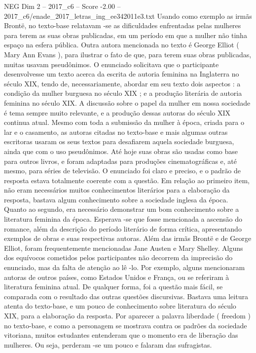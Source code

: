 \begin{textsample}{NEG Dim 2 – 2017\_c6 – Score -2.00 – 2017\_c6/enade\_2017\_letras\_ing\_ee342011e3.txt}
Usando como exemplo as irmãs Brontë, no texto-base relatavam -se as dificuldades enfrentadas pelas mulheres para terem as suas obras publicadas, em um período em que a mulher não tinha espaço na esfera pública.
Outra autora mencionada no texto é George Elliot ( Mary Ann Evans ), para ilustrar o fato de que, para terem suas obras publicadas, muitas usavam pseudônimos.
O enunciado solicitava que o participante desenvolvesse um texto acerca da escrita de autoria feminina na Inglaterra no século XIX, tendo de, necessariamente, abordar em seu texto dois aspectos : a condição da mulher burguesa no século XIX ; e a produção literária de autoria feminina no século XIX.
A discussão sobre o papel da mulher em nossa sociedade é tema sempre muito relevante, e a produção dessas autoras do século XIX continua atual.
Mesmo com toda a submissão da mulher à época, criada para o lar e o casamento, as autoras citadas no texto-base e mais algumas outras escritoras usaram os seus textos para desafiarem aquela sociedade burguesa, ainda que com o uso pseudônimos.
Até hoje suas obras são usadas como base para outros livros, e foram adaptadas para produções cinematográficas e, até mesmo, para séries de televisão.
O enunciado foi claro e preciso, e o padrão de resposta estava totalmente coerente com a questão.
Em relação ao primeiro item, não eram necessários muitos conhecimentos literários para a elaboração da resposta, bastava algum conhecimento sobre a sociedade inglesa da época.
Quanto ao segundo, era necessário demonstrar um bom conhecimento sobre a literatura feminina da época.
Esperava -se que fosse mencionada a ascensão do romance, além da descrição do período literário de forma crítica, apresentando exemplos de obras e suas respectivas autoras.
Além das irmãs Brontë e de George Elliot, foram frequentemente mencionadas Jane Austen e Mary Shelley.
Alguns dos equívocos cometidos pelos participantes não decorrem da imprecisão do enunciado, mas da falta de atenção ao lê -lo.
Por exemplo, alguns mencionaram autoras de outros países, como Estados Unidos e França, ou se referiram à literatura feminina atual.
De qualquer forma, foi a questão mais fácil, se comparada com o resultado das outras questões discursivas.
Bastava uma leitura atenta do texto-base, e um pouco de conhecimento sobre literatura do século XIX, para a elaboração da resposta.
Por aparecer a palavra liberdade ( freedom ) no texto-base, e como a personagem se mostrava contra os padrões da sociedade vitoriana, muitos estudantes entenderam que o momento era de liberação das mulheres.
Ou seja, perderam -se um pouco e falaram das sufragistas.

\end{textsample}
